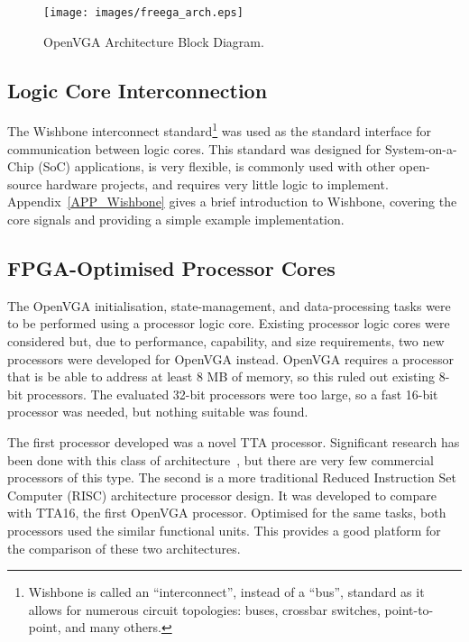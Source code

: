 \begin{figure}[h!]
\begin{center}
\texttt{[image: images/freega\_arch.eps]}
\caption[OpenVGA Architecture Block Diagram]{OpenVGA Architecture Block Diagram.}
\label{OPENVGA_Arch}
\end{center}
\end{figure}


\subsection{Logic Core Interconnection}
The Wishbone interconnect standard\footnote{Wishbone is called an
``interconnect'', instead of a ``bus'', standard as it allows for numerous
circuit topologies: buses, crossbar switches, point-to-point, and many others.}
was used as the standard interface for communication between logic cores. This
standard was designed for System-on-a-Chip (SoC) applications, is very flexible, is commonly
used with other open-source hardware projects, and requires very little logic to
implement. Appendix~\ref{APP_Wishbone} gives a brief introduction to Wishbone,
covering the core signals and providing a simple example implementation.


\subsection{FPGA-Optimised Processor Cores}
The OpenVGA initialisation, state-management, and data-processing tasks were to
be performed using a processor logic core. Existing processor logic cores were
considered but, due to performance, capability, and size requirements, two new
processors were developed for OpenVGA instead. OpenVGA requires a processor that
is be able to address at least 8 MB of memory, so this ruled out existing 8-bit
processors. The evaluated 32-bit processors were too large, so a fast 16-bit
processor was needed, but nothing suitable was found.

The first processor developed was a novel TTA processor. Significant research has
been done with this class of architecture~\cite{corporaal1993maa,
jaaskelainen2007cta}, but there are very few commercial processors of this type.
The second is a more traditional Reduced Instruction Set
Computer
(RISC) architecture processor design. It was developed to compare with TTA16, the
first OpenVGA processor. Optimised for the same tasks, both processors used the
similar functional units. This provides a good platform for the comparison of
these two architectures.


